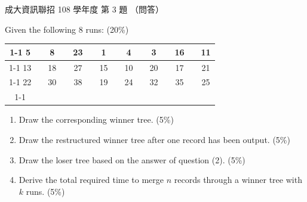 \begin{pastexam}[label={px:ncku-108-prog-03}]{成大資訊聯招 108 學年度 第 3 題}
（問答）

Given the following 8 runs: (20\%)
\begin{center}
\setlength{\tabcolsep}{3pt}
\begin{tabular}{|c|c|c|c|c|c|c|c|c|c|c|c|c|c|c|}
\cline{1-1}\cline{3-3}\cline{5-5}\cline{7-7}\cline{9-9}\cline{11-11}\cline{13-13}\cline{15-15}
5 & \multicolumn{1}{c|}{} & 8 & \multicolumn{1}{c|}{} & 23 & \multicolumn{1}{c|}{} & 1 & \multicolumn{1}{c|}{} & 4 & \multicolumn{1}{c|}{} & 3 & \multicolumn{1}{c|}{} & 16 & \multicolumn{1}{c|}{} & 11 \\
\cline{1-1}\cline{3-3}\cline{5-5}\cline{7-7}\cline{9-9}\cline{11-11}\cline{13-13}\cline{15-15}
13 & \multicolumn{1}{c|}{} & 18 & \multicolumn{1}{c|}{} & 27 & \multicolumn{1}{c|}{} & 15 & \multicolumn{1}{c|}{} & 10 & \multicolumn{1}{c|}{} & 20 & \multicolumn{1}{c|}{} & 17 & \multicolumn{1}{c|}{} & 21 \\
\cline{1-1}\cline{3-3}\cline{5-5}\cline{7-7}\cline{9-9}\cline{11-11}\cline{13-13}\cline{15-15}
22 & \multicolumn{1}{c|}{} & 30 & \multicolumn{1}{c|}{} & 38 & \multicolumn{1}{c|}{} & 19 & \multicolumn{1}{c|}{} & 24 & \multicolumn{1}{c|}{} & 32 & \multicolumn{1}{c|}{} & 35 & \multicolumn{1}{c|}{} & 25 \\
\cline{1-1}\cline{3-3}\cline{5-5}\cline{7-7}\cline{9-9}\cline{11-11}\cline{13-13}\cline{15-15}
\end{tabular}
\end{center}
\begin{enumerate}[label=(\arabic*)]
\item Draw the corresponding winner tree. (5\%)
\item Draw the restructured winner tree after one record has been output. (5\%)
\item Draw the loser tree based on the answer of question (2). (5\%)
\item Derive the total required time to merge $n$ records through a winner tree with $k$ runs. (5\%)
\end{enumerate}
\end{pastexam}

